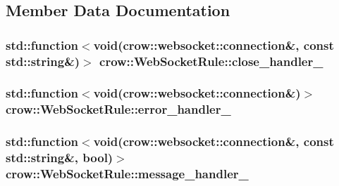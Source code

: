 \subsection{Member Data Documentation}
\hypertarget{classcrow_1_1_web_socket_rule_a52beafa459eb950ed8976442a6513b6b}{
\subsubsection[{close\-\_\-handler\-\_\-}]{\setlength{\rightskip}{0pt plus 5cm}std\-::function$<$void({\bf crow\-::websocket\-::connection}\&, const std\-::string\&)$>$ crow\-::\-Web\-Socket\-Rule\-::close\-\_\-handler\-\_\-\hspace{0.3cm}{\ttfamily [protected]}}}\label{classcrow_1_1_web_socket_rule_a52beafa459eb950ed8976442a6513b6b}
\hypertarget{classcrow_1_1_web_socket_rule_adaefbea10b7188ca0ae763b3c345d4f2}{
\subsubsection[{error\-\_\-handler\-\_\-}]{\setlength{\rightskip}{0pt plus 5cm}std\-::function$<$void({\bf crow\-::websocket\-::connection}\&)$>$ crow\-::\-Web\-Socket\-Rule\-::error\-\_\-handler\-\_\-\hspace{0.3cm}{\ttfamily [protected]}}}\label{classcrow_1_1_web_socket_rule_adaefbea10b7188ca0ae763b3c345d4f2}
\hypertarget{classcrow_1_1_web_socket_rule_af9ce04bc88244ed4fb733dd9e52fc955}{
\subsubsection[{message\-\_\-handler\-\_\-}]{\setlength{\rightskip}{0pt plus 5cm}std\-::function$<$void({\bf crow\-::websocket\-::connection}\&, const std\-::string\&, bool)$>$ crow\-::\-Web\-Socket\-Rule\-::message\-\_\-handler\-\_\-\hspace{0.3cm}{\ttfamily [protected]}}}\label{classcrow_1_1_web_socket_rule_af9ce04bc88244ed4fb733dd9e52fc955}
